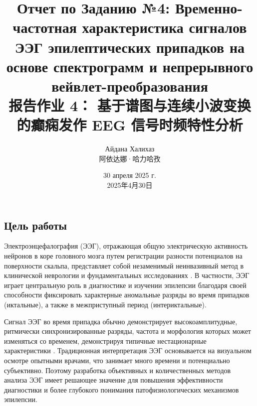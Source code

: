 \documentclass{article}
\title{Отчет по Заданию №4: Временно-частотная характеристика сигналов ЭЭГ эпилептических припадков на основе спектрограмм и непрерывного вейвлет-преобразования \\ \large 报告作业 4： 基于谱图与连续小波变换的癫痫发作 EEG 信号时频特性分析}
\author{Айдана Халихаз \\阿依达娜·哈力哈孜}
\date{30 апреля 2025 г. \\ 2025年4月30日}
\providecommand{\pcsync}{\par\vspace{\baselineskip}} %
\begin{document}
\maketitle %



\begin{paracol}{2} %
\setlength{\columnsep}{20pt} %
\setlength{\emergencystretch}{3em} %


\section{Цель работы}
\pcsync %

Электроэнцефалография (ЭЭГ), отражающая общую электрическую активность нейронов в коре головного мозга путем регистрации разности потенциалов на поверхности скальпа, представляет собой незаменимый неинвазивный метод в клинической неврологии и фундаментальных исследованиях \cite{Niedermeyer2005}. В частности, ЭЭГ играет центральную роль в диагностике и изучении эпилепсии благодаря своей способности фиксировать характерные аномальные разряды во время припадков (иктальные), а также в межприступный период (интериктальные)\cite{Engel2008}.

Сигнал ЭЭГ во время припадка обычно демонстрирует высокоамплитудные, ритмически синхронизированные разряды, частота и морфология которых может изменяться со временем, демонстрируя типичные нестационарные характеристики \cite{Jiruska2013}. Традиционная интерпретация ЭЭГ основывается на визуальном осмотре опытными врачами, что занимает много времени и потенциально субъективно. Поэтому разработка объективных и количественных методов анализа ЭЭГ имеет решающее значение для повышения эффективности диагностики и более глубокого понимания патофизиологических механизмов эпилепсии.


\end{paracol}
\end{document}
